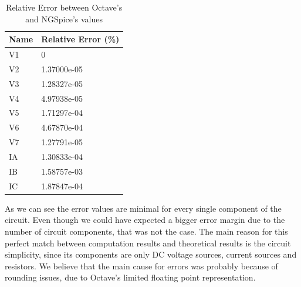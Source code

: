 \documentclass[11en, a4paper, oneside]{article}
\begin{document}
\begin{table}[h]
\begin{center}
\begin{tabular}{|l|l|}
\hline
\textbf{Name}    & \textbf{Relative Error (\%)} \\\hline
V1 & 0           \\\hline
V2 & 1.37000e-05 \\\hline
V3 & 1.28327e-05 \\\hline
V4 & 4.97938e-05 \\\hline
V5 & 1.71297e-04 \\\hline
V6 & 4.67870e-04 \\\hline
V7 & 1.27791e-05 \\\hline
IA & 1.30833e-04 \\\hline
IB & 1.58757e-03 \\\hline
IC & 1.87847e-04 \\\hline
\end{tabular}
\caption{Relative Error between Octave's and NGSpice's values}
\end{center}
\end{table}

As we can see the error values are minimal for every single component of the circuit. Even though we could have expected a bigger error margin due to the number of circuit components, that was not the case. The main reason for this perfect match between computation results and theoretical results is the circuit simplicity, since its components are only DC voltage sources, current sources and resistors. We believe that the main cause for errors was probably because of rounding issues, due to Octave's limited floating point representation.
\end{document}
